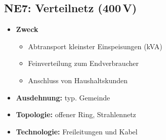 \subsection{NE7: Verteilnetz (400\,V)}
    \begin{minipage}[t]{0.5\columnwidth}
        \begin{itemize}
            \item \textbf{Zweck}
            \begin{itemize}
                \item Abtransport kleinster Einspeisungen (kVA)
                \item Feinverteilung zum Endverbraucher
                \item Anschluss von Haushaltskunden
            \end{itemize}
        \end{itemize}
    \end{minipage}%
    \hfill
    \begin{minipage}[t]{0.49\columnwidth}
        \begin{itemize}
            \item \textbf{Ausdehnung:} typ. Gemeinde
            \item \textbf{Topologie:} offener Ring, Strahlennetz
            \item \textbf{Technologie:} Freileitungen und Kabel
        \end{itemize}
    \end{minipage}





















